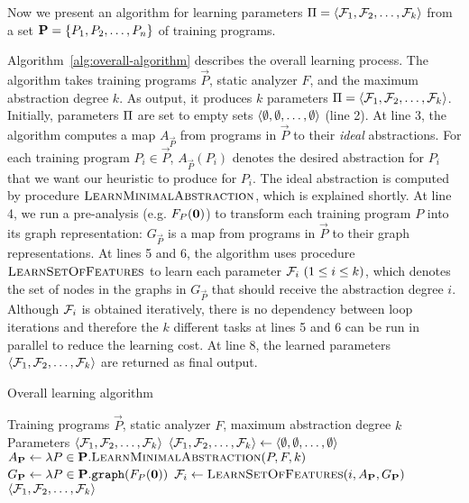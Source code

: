 Now we present an algorithm for learning parameters $\Pi = \langle \mathcal{F}_1, \mathcal{F}_2, \dots, \mathcal{F}_k \rangle$ from a set $\mathbf{P} = \{ P_1, P_2, \dots, P_n \}$ of training programs.

Algorithm~\ref{alg:overall-algorithm} describes the overall learning process.
The algorithm takes training programs $\vec{P}$, static analyzer $F$, and the maximum abstraction degree $k$. As output, it produces $k$ parameters $\Pi = \langle \mathcal{F}_1, \mathcal{F}_2, \dots, \mathcal{F}_{k} \rangle$.
Initially, parameters $\Pi$ are set to empty sets $\langle \emptyset,\emptyset,\dots,\emptyset \rangle$ (line 2).
At line 3, the algorithm computes a map $A_\vec{P}$ from programs in $\vec{P}$ to their {\em ideal} abstractions.
For each training program $P_i \in \vec{P}$, $A_\vec{P}(P_i)$ denotes the desired abstraction for $P_i$ that we want our heuristic to produce for $P_i$.
The ideal abstraction is computed by procedure $\textsc{LearnMinimalAbstraction}$, which is explained shortly.
At line 4, we run a pre-analysis (e.g. $F_P({\bf 0})$) to transform each training program $P$ into its graph representation:
 $G_\vec{P}$ is a map from programs in $\vec{P}$ to their graph representations.
At lines 5 and 6, the algorithm
uses procedure $\textsc{LearnSetOfFeatures}$ to learn each parameter $\mathcal{F}_i~(1 \le i \le k)$, which denotes the set of nodes in the graphs in $G_\vec{P}$ that should receive the abstraction degree $i$.
Although $\mathcal{F}_i$ is obtained iteratively,
there is no dependency between loop iterations and therefore the $k$ different tasks at lines 5 and 6 can be run in parallel to reduce the learning cost.
At line 8, the learned parameters $\langle \mathcal{F}_1, \mathcal{F}_2,\dots, \mathcal{F}_k \rangle$ are returned as final output.

\begin{algorithm}[t]
	\caption{Overall learning algorithm}\label{alg:overall-algorithm}
	\begin{algorithmic}[1]
		\Require Training programs $\vec{P}$, static analyzer $F$, maximum abstraction degree $k$
		\Ensure Parameters $\langle \mathcal{F}_1,\mathcal{F}_2,\dots,\mathcal{F}_k \rangle$
		\State
		$\langle \mathcal{F}_1,\mathcal{F}_2,\dots,\mathcal{F}_k \rangle \gets \langle \emptyset,\emptyset,\dots,\emptyset \rangle$
		\State
		$A_{\mathbf{P}} \gets \lambda P \in \mathbf{P}. {\textsc{LearnMinimalAbstraction}}(P,F,k)$ 
		\State
		$G_{\mathbf{P}} \gets \lambda P\in \mathbf{P}.{{\tt graph}}(F_P({\bf 0}))$ 
		\State
			$\mathcal{F}_i \gets \textsc{LearnSetOfFeatures}(i,A_{\mathbf{P}},G_{\mathbf{P}})$
		\EndFor
		\State \Return $\langle \mathcal{F}_1,\mathcal{F}_2,\dots,\mathcal{F}_k \rangle$
		\EndProcedure
	\end{algorithmic}
\end{algorithm}


